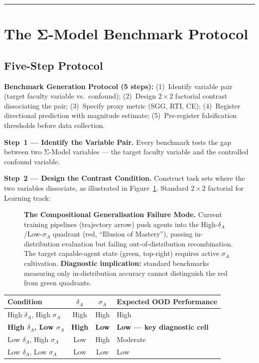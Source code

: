 \documentclass[11pt,a4paper]{article}
\begin{document}
\noindent\rule{\linewidth}{0.4pt}

\section{The Σ-Model Benchmark Protocol}\label{sec:benchmark-protocol}

\subsection{Five-Step Protocol}\label{sec:five-step}

\textbf{Benchmark Generation Protocol (5 steps):}
(1)~Identify variable pair (target faculty variable vs.\ confound);
(2)~Design $2{\times}2$ factorial contrast dissociating the pair;
(3)~Specify proxy metric (SGG, RTI, CE);
(4)~Register directional prediction with magnitude estimate;
(5)~Pre-register falsification thresholds before data collection.

\textbf{Step~1 --- Identify the Variable Pair.} Every benchmark tests
the gap between two Σ-Model variables --- the target faculty variable and
the controlled confound variable.

\textbf{Step~2 --- Design the Contrast Condition.} Construct task sets
where the two variables dissociate, as illustrated in Figure~\ref{fig:diagnostic}. Standard $2\times 2$ factorial for
Learning track:

\begin{figure}[htbp]
\centering
\resizebox{0.7\textwidth}{!}{}
\caption{\textbf{The Compositional Generalisation Failure Mode.} Current
training pipelines (trajectory arrow) push agents into the
High-$\delta_A$/Low-$\sigma_A$ quadrant (red, ``Illusion of Mastery''),
passing in-distribution evaluation but failing out-of-distribution
recombination. The target capable-agent state (green, top-right) requires
active $\sigma_A$ cultivation. \textbf{Diagnostic implication:} standard
benchmarks measuring only in-distribution accuracy cannot distinguish
the red from green quadrants.}
\label{fig:diagnostic}
\end{figure}

\begin{center}
\begin{tabular}{>{\raggedright}p{4cm} c c >{\raggedright\arraybackslash}p{5cm}}
\toprule
\textbf{Condition} & $\delta_A$ & $\sigma_A$ & \textbf{Expected OOD Performance} \\
\midrule
High $\delta_A$, High $\sigma_A$ & High & High & High \\
\textbf{High $\delta_A$, Low $\sigma_A$} & \textbf{High} & \textbf{Low} & \textbf{Low --- key diagnostic cell} \\
Low $\delta_A$, High $\sigma_A$ & Low & High & Moderate \\
Low $\delta_A$, Low $\sigma_A$ & Low & Low & Low \\
\bottomrule
\end{tabular}
\end{center}
\end{document}
